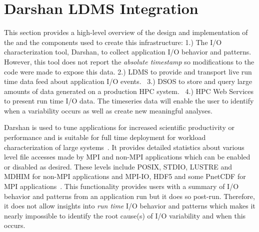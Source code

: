 \section{Darshan LDMS Integration}
\label{sec:DarshanLDMSIntegration}

This section provides a high-level overview of the design and implementation of the \Darshan and the components used to create this infrastructure:
	1.) The I/O characterization tool, Darshan, to collect application I/O behavior and patterns. However, this tool does not report the \emph{absolute timestamp} so modifications to the code were made to expose this data.
	2.) LDMS to provide and transport live run time data feed about application I/O events.~\cite{ldmsgithubwiki}
	3.) DSOS to store and query large amounts of data generated on a production HPC system.~\cite{sosgithub}
	4.) HPC Web Services to present run time I/O data. The timeseries data will enable the user to identify when a variability occurs as well as create new meaningful analyses.~\cite{ClusterAV}


Darshan is used to tune applications for increased scientific productivity or performance and is suitable for full time deployment for workload characterization of large systems~\cite{darshan-webpage}. It provides detailed statistics about various level file accesses made by MPI and non-MPI applications which can be enabled or disabled as desired. These levels include POSIX, STDIO, LUSTRE and MDHIM for non-MPI applications and MPI-IO, HDF5 and some PnetCDF for MPI applications~\cite{darshan-runtime}. This functionality provides users with a summary of I/O behavior and patterns from an application run but it does so post-run. Therefore, it does not allow insights into \emph{run time} I/O behavior and patterns which makes it nearly impossible to identify the root cause(s) of I/O variability and when this occurs. 

